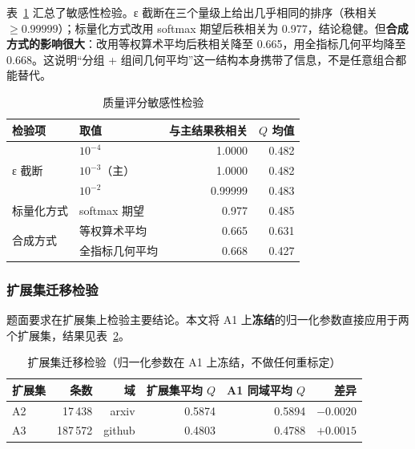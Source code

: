表~\ref{tab:q1_sens} 汇总了敏感性检验。ε 截断在三个量级上给出几乎相同的排序（秩相关 $\ge0.99999$）；标量化方式改用 softmax 期望后秩相关为 0.977，结论稳健。但\textbf{合成方式的影响很大}：改用等权算术平均后秩相关降至 0.665，用全指标几何平均降至 0.668。这说明``分组 + 组间几何平均''这一结构本身携带了信息，不是任意组合都能替代。

\begin{table}[htbp]
\centering
\caption{质量评分敏感性检验}
\label{tab:q1_sens}
\small
\begin{tabular}{l|l|r|r}
\toprule
\textbf{检验项} & \textbf{取值} & \textbf{与主结果秩相关} & \textbf{$Q$ 均值} \\
\midrule
\multirow{3}{*}{ε 截断} & $10^{-4}$ & 1.0000 & 0.482 \\
                        & $10^{-3}$（主） & 1.0000 & 0.482 \\
                        & $10^{-2}$ & 0.99999 & 0.483 \\
标量化方式 & softmax 期望 & 0.977 & 0.485 \\
\multirow{2}{*}{合成方式} & 等权算术平均 & 0.665 & 0.631 \\
                          & 全指标几何平均 & 0.668 & 0.427 \\
\bottomrule
\end{tabular}
\end{table}

\subsubsection{扩展集迁移检验}
\label{sec:q1_ext}

题面要求在扩展集上检验主要结论。本文将 A1 上\textbf{冻结}的归一化参数直接应用于两个扩展集，结果见表~\ref{tab:q1_ext}。

\begin{table}[htbp]
\centering
\caption{扩展集迁移检验（归一化参数在 A1 上冻结，不做任何重标定）}
\label{tab:q1_ext}
\small
\begin{tabular}{l|r|r|r|r|r}
\toprule
\textbf{扩展集} & \textbf{条数} & \textbf{域} & \textbf{扩展集平均 $Q$} & \textbf{A1 同域平均 $Q$} & \textbf{差异} \\
\midrule
A2 & 17\,438 & arxiv & 0.5874 & 0.5894 & $-0.0020$ \\
A3 & 187\,572 & github & 0.4803 & 0.4788 & $+0.0015$ \\
\bottomrule
\end{tabular}
\end{table}

